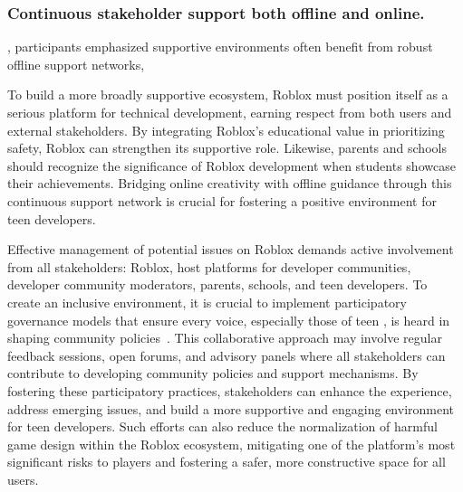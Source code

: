 \subsubsection{\textbf{Continuous stakeholder support both offline and online.}}
, participants emphasized  supportive  environments often benefit from robust offline support networks, 

 To build a more broadly supportive ecosystem, Roblox must position itself as a serious platform for technical development, earning respect from both users and external stakeholders. By integrating Roblox’s educational value in prioritizing  safety, Roblox can strengthen its supportive role. Likewise, parents and schools should recognize  the significance of Roblox development when students showcase their achievements. Bridging online creativity with offline guidance through this continuous support network is crucial for fostering a positive environment for teen developers.

Effective management of potential issues on Roblox demands active involvement from all stakeholders: Roblox, host platforms for developer communities, developer community moderators, parents, schools, and teen developers. To create an inclusive environment, it is crucial to implement participatory governance models that ensure every voice, especially those of teen , is heard in shaping community policies~\cite{wang202312}. This collaborative approach may involve regular feedback sessions, open forums, and advisory panels where all stakeholders can contribute to developing community policies and support mechanisms. By fostering these participatory practices, stakeholders can enhance the  experience, address emerging issues, and build a more supportive and engaging environment for teen developers.  Such efforts can also reduce the normalization of harmful game design within the Roblox ecosystem, mitigating one of the platform’s most significant risks to players and fostering a safer, more constructive space for all users. 

